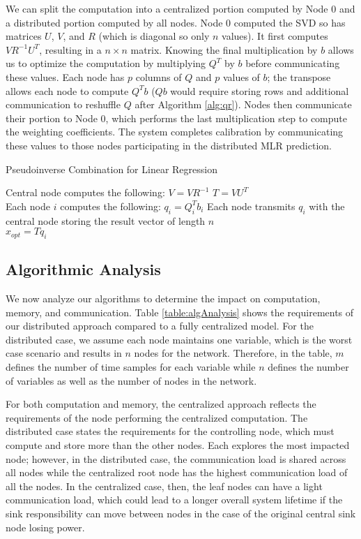 \documentclass[prodmode,acmtosn]{acmsmall}
\begin{document}
We can split the computation into a centralized portion computed by Node 0 and a distributed portion computed by all nodes.
Node 0 computed the SVD so has matrices $U$, $V$, and $R$ (which is diagonal so only $n$ values).
It first computes $VR^{-1}U^T$, resulting in a $n \times n$ matrix.
Knowing the final multiplication by $b$ allows us to optimize the computation by multiplying $Q^T$ by $b$ before communicating these values.
Each node has $p$ columns of $Q$ and $p$ values of $b$; the transpose allows each node to compute $Q^Tb$ ($Qb$ would require storing rows and additional communication to reshuffle $Q$ after Algorithm \ref{alg:qr}).
Nodes then communicate their portion to Node 0, which performs the last multiplication step to compute the weighting coefficients.
The system completes calibration by communicating these values to those nodes participating in the distributed MLR prediction.

\begin{algorithm}[h]
\begin{algorithmic}
\caption{Pseudoinverse Combination for Linear Regression}\label{alg:picalregCent}
\State Central node computes the following:
\State $V=VR^{-1}$
\State $\mathit{T} =VU^T$ \\

\State Each node $i$ computes the following:
\State $q_i=Q_i^Tb_i$
\State Each node transmits $q_i$ with the central node storing the result vector of length $n$ \\

\State $x_{opt}=\mathit{T} q_i$
\end{algorithmic}
\end{algorithm}

\subsection{Algorithmic Analysis}
We now analyze our algorithms to determine the impact on computation, memory, and communication.
Table \ref{table:algAnalysis} shows the requirements of our distributed approach compared to a fully centralized model.
For the distributed case, we assume each node maintains one variable, which is the worst case scenario and results in $n$ nodes for the network. 
Therefore, in the table, $m$ defines the number of time samples for each variable while $n$ defines the number of variables as well as the number of nodes in the network.

For both computation and memory, the centralized approach reflects the requirements of the node performing the centralized computation.
The distributed case states the requirements for the controlling node, which must compute and store more than the other nodes.
Each explores the most impacted node; however, in the distributed case, the communication load is shared across all nodes while the centralized root node has the highest communication load of all the nodes.
In the centralized case, then, the leaf nodes can have a light communication load, which could lead to a longer overall system lifetime if the sink responsibility can move between nodes in the case of the original central sink node losing power.
\end{document}
